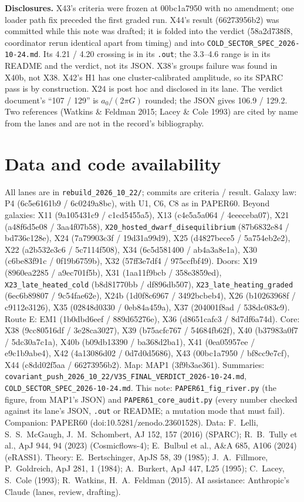 \documentclass[10pt]{article}
\begin{document}
\textbf{Disclosures.} X43's criteria were frozen at 00bc1a7950 with no amendment; one loader path fix preceded the first graded run. X44's result (66273956b2) was committed while this note was drafted; it is folded into the verdict (58a2d738f8, coordinator rerun identical apart from timing) and into \texttt{COLD\_SECTOR\_SPEC\_2026-10-24.md}. Its 4.21 / 4.20 crossing is in its \texttt{.out}; the 3.3--4.6 range is in its README and the verdict, not its JSON. X38's groups failure was found in X40b, not X38. X42's H1 has one cluster-calibrated amplitude, so its SPARC pass is by construction. X24 is post hoc and disclosed in its lane. The verdict document's ``107 / 129'' is $a_0/(2\pi G)$ rounded; the JSON gives 106.9 / 129.2. Two references (Watkins \& Feldman 2015; Lacey \& Cole 1993) are cited by name from the lanes and are not in the record's bibliography.

\section{Data and code availability}
{\footnotesize
All lanes are in \texttt{rebuild\_2026\_10\_22/}; commits are criteria / result. Galaxy law: P4 (6c5e6161b9 / 6c0249a8bc), with U1, C6, C8 as in PAPER60. Beyond galaxies: X11 (9a105431c9 / c1cd5455a5), X13 (c4e5a5a064 / 4eeeceba07), X21 (a48f6d5e08 / 3aa4f07b58), \texttt{X20\_hosted\_dwarf\_disequilibrium} (87b6832e84 / bd736c128e), X24 (7a79903c3f / 19d31a99d9), X25 (d4827bece5 / 5a754eb2e2), X22 (a2b532e3c6 / 5c7114f508), X34 (6c5d581400 / ab4a3a8e1a), X30 (c6be83f91c / 0f19b6759b), X32 (57ff3e7df4 / 975ccfbf49). Doors: X19 (8960ea2285 / a9ec701f5b), X31 (1aa11f9bcb / 358e3859ed), \texttt{X23\_late\_heated\_cold} (b8d81770bb / df896db507), \texttt{X23\_late\_heating\_graded} (6ec6b89807 / 9c54fae62e), X24b (1d0f8c6967 / 3492bcbeb4), X26 (b10263968f / c9112e3126), X35 (02848d0330 / 0eb84a459a), X37 (204001f8ad / 538dc083c9). Route E: EM1 (1b0dbd6eef / 889d65276e), X36 (d8651cafc3 / 8d7df6a74d). Core: X38 (9cc80516df / 3e28ca3027), X39 (b75acfc767 / 54684fb62f), X40 (b37983a0f7 / 5dc30a7c1a), X40b (b09db13390 / ba368d2ba1), X41 (0ea05957ee / e9c1b9abe4), X42 (4a13086d02 / 0d7d0d5686), X43 (00bc1a7950 / bf8cc9e7cf), X44 (c8dd02f5aa / 66273956b2). Map: MAP1 (3f9b3ae361). Summaries: \texttt{covariant\_push\_2026\_10\_22/V3S\_FINAL\_VERDICT\_2026-10-24.md}, \texttt{COLD\_SECTOR\_SPEC\_2026-10-24.md}. This note: \texttt{PAPER61\_fig\_river.py} (the figure, from MAP1's JSON) and \texttt{PAPER61\_core\_audit.py} (every number checked against its lane's JSON, \texttt{.out} or README; a mutation mode that must fail). Companion: PAPER60 (doi:10.5281/zenodo.23601528).
Data: F.~Lelli, S.~S.~McGaugh, J.~M.~Schombert, AJ 152, 157 (2016) (SPARC); R.~B.~Tully et al., ApJ 944, 94 (2023) (Cosmicflows-4); E.~Bulbul et al., A\&A 685, A106 (2024) (eRASS1).
Theory: E.~Bertschinger, ApJS 58, 39 (1985); J.~A.~Fillmore, P.~Goldreich, ApJ 281, 1 (1984); A.~Burkert, ApJ 447, L25 (1995); C.~Lacey, S.~Cole (1993); R.~Watkins, H.~A.~Feldman (2015).
AI assistance: Anthropic's Claude (lanes, review, drafting).}
\end{document}
